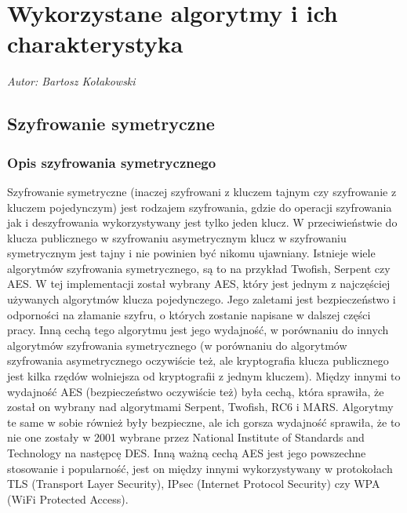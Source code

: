 \chapter{Wykorzystane algorytmy i ich charakterystyka}
\textit{Autor: Bartosz Kołakowski}
\setlength{\parindent}{0pt}

\section{Szyfrowanie symetryczne}
\subsection{Opis szyfrowania symetrycznego}
Szyfrowanie symetryczne (inaczej szyfrowani z kluczem tajnym czy szyfrowanie z kluczem pojedynczym) jest rodzajem szyfrowania, gdzie do operacji szyfrowania jak i deszyfrowania wykorzystywany jest tylko jeden klucz. W przeciwieństwie do klucza publicznego w szyfrowaniu asymetrycznym klucz w szyfrowaniu symetrycznym jest tajny i nie powinien być nikomu ujawniany. Istnieje wiele algorytmów szyfrowania symetrycznego, są to na przykład Twofish, Serpent czy AES. W tej implementacji został wybrany AES, który jest jednym z najczęściej używanych algorytmów klucza pojedynczego. Jego zaletami jest bezpieczeństwo i odporności na złamanie szyfru, o których zostanie napisane w dalszej części pracy. Inną cechą tego algorytmu jest jego wydajność, w porównaniu do innych algorytmów szyfrowania symetrycznego (w porównaniu do algorytmów szyfrowania asymetrycznego oczywiście też, ale kryptografia klucza publicznego jest kilka rzędów wolniejsza od kryptografii z jednym kluczem). Między innymi to wydajność AES (bezpieczeństwo oczywiście też) była cechą, która sprawiła, że został on wybrany nad algorytmami Serpent, Twofish, RC6 i MARS. Algorytmy te same w sobie również były bezpieczne, ale ich gorsza wydajność sprawiła, że to nie one zostały w 2001 wybrane przez National Institute of Standards and Technology na następcę DES. Inną ważną cechą AES jest jego powszechne stosowanie i popularność, jest on między innymi wykorzystywany w protokołach TLS (Transport Layer Security), IPsec (Internet Protocol Security) czy WPA (WiFi Protected Access).

